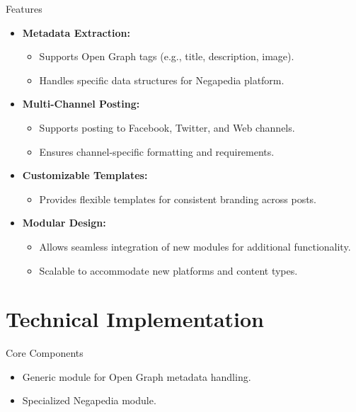 \documentclass{beamer}
\begin{document}
    \begin{frame}{Features}
        \begin{itemize}
            \item \textbf{Metadata Extraction:}
                \begin{itemize}
                    \item Supports Open Graph tags (e.g., title, description, image).
                    \item Handles specific data structures for Negapedia platform.
                \end{itemize}
            \vspace{0.3cm}
            \item \textbf{Multi-Channel Posting:}
                \begin{itemize}
                    \item Supports posting to Facebook, Twitter, and Web channels.
                    \item Ensures channel-specific formatting and requirements.
                \end{itemize}
            \vspace{0.3cm}
            \item \textbf{Customizable Templates:}
                \begin{itemize}
                    \item Provides flexible templates for consistent branding across posts.
                \end{itemize}
            \vspace{0.3cm}
            \item \textbf{Modular Design:}
                \begin{itemize}
                    \item Allows seamless integration of new modules for additional functionality.
                    \item Scalable to accommodate new platforms and content types.
                \end{itemize}
        \end{itemize}
    \end{frame}


\section{Technical Implementation}
    \begin{frame}{Core Components}
        \begin{itemize}
            \item Generic module for Open Graph metadata handling.
            \item Specialized Negapedia module.
        \end{itemize}
    \end{frame}
\end{document}
